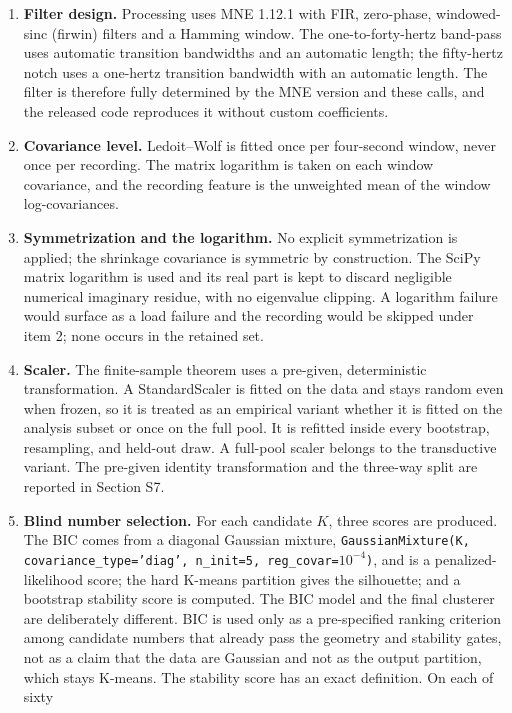 \begin{enumerate}
  Resampling uses the default FFT method with automatic padding.
\item
  \textbf{Filter design.} Processing uses MNE 1.12.1 with FIR,
  zero-phase, windowed-sinc (firwin) filters and a Hamming window. The
  one-to-forty-hertz band-pass uses automatic transition bandwidths and
  an automatic length; the fifty-hertz notch uses a one-hertz transition
  bandwidth with an automatic length. The filter is therefore fully
  determined by the MNE version and these calls, and the released code
  reproduces it without custom coefficients.
\item
  \textbf{Covariance level.} Ledoit--Wolf is fitted once per four-second
  window, never once per recording. The matrix logarithm is taken on
  each window covariance, and the recording feature is the unweighted
  mean of the window log-covariances.
\item
  \textbf{Symmetrization and the logarithm.} No explicit symmetrization
  is applied; the shrinkage covariance is symmetric by construction. The
  SciPy matrix logarithm is used and its real part is kept to discard
  negligible numerical imaginary residue, with no eigenvalue clipping. A
  logarithm failure would surface as a load failure and the recording
  would be skipped under item 2; none occurs in the retained set.
\item
  \textbf{Scaler.} The finite-sample theorem uses a pre-given,
  deterministic transformation. A StandardScaler is fitted on the data
  and stays random even when frozen, so it is treated as an empirical
  variant whether it is fitted on the analysis subset or once on the
  full pool. It is refitted inside every bootstrap, resampling, and
  held-out draw. A full-pool scaler belongs to the transductive variant.
  The pre-given identity transformation and the three-way split are
  reported in Section S7.
\item
  \textbf{Blind number selection.} For each candidate \(K\), three
  scores are produced. The BIC comes from a diagonal Gaussian mixture,
  \texttt{GaussianMixture(K, covariance\_type='diag', n\_init=5, reg\_covar=$10^{-4}$)},
  and is a penalized-likelihood score; the hard K-means partition gives
  the silhouette; and a bootstrap stability score is computed. The BIC
  model and the final clusterer are deliberately different. BIC is used
  only as a pre-specified ranking criterion among candidate numbers that
  already pass the geometry and stability gates, not as a claim that the
  data are Gaussian and not as the output partition, which stays
  K-means. The stability score has an exact definition. On each of sixty

\end{enumerate}
